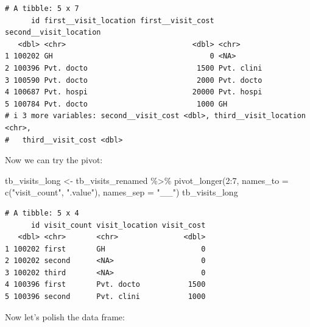 \documentclass[
  letterpaper,
  DIV=11,
  numbers=noendperiod]{scrreprt}
\newenvironment{Shaded}{\begin{snugshade}}{\end{snugshade}}
\newcommand{\AttributeTok}[1]{\textcolor[rgb]{0.40,0.45,0.13}{#1}}
\newcommand{\DecValTok}[1]{\textcolor[rgb]{0.68,0.00,0.00}{#1}}
\newcommand{\FunctionTok}[1]{\textcolor[rgb]{0.28,0.35,0.67}{#1}}
\newcommand{\NormalTok}[1]{\textcolor[rgb]{0.00,0.23,0.31}{#1}}
\newcommand{\OtherTok}[1]{\textcolor[rgb]{0.00,0.23,0.31}{#1}}
\newcommand{\SpecialCharTok}[1]{\textcolor[rgb]{0.37,0.37,0.37}{#1}}
\newcommand{\StringTok}[1]{\textcolor[rgb]{0.13,0.47,0.30}{#1}}
\begin{document}
\begin{verbatim}
# A tibble: 5 x 7
      id first__visit_location first__visit_cost second__visit_location
   <dbl> <chr>                             <dbl> <chr>                 
1 100202 GH                                    0 <NA>                  
2 100396 Pvt. docto                         1500 Pvt. clini            
3 100590 Pvt. docto                         2000 Pvt. docto            
4 100687 Pvt. hospi                        20000 Pvt. hospi            
5 100784 Pvt. docto                         1000 GH                    
# i 3 more variables: second__visit_cost <dbl>, third__visit_location <chr>,
#   third__visit_cost <dbl>
\end{verbatim}

Now we can try the pivot:

\begin{Shaded}
\begin{Highlighting}[]
\NormalTok{tb\_visits\_long }\OtherTok{\textless{}{-}}
\NormalTok{  tb\_visits\_renamed }\SpecialCharTok{\%\textgreater{}\%} 
  \FunctionTok{pivot\_longer}\NormalTok{(}\DecValTok{2}\SpecialCharTok{:}\DecValTok{7}\NormalTok{, }
               \AttributeTok{names\_to =} \FunctionTok{c}\NormalTok{(}\StringTok{"visit\_count"}\NormalTok{, }\StringTok{".value"}\NormalTok{), }
               \AttributeTok{names\_sep =} \StringTok{"\_\_"}\NormalTok{)}
\NormalTok{tb\_visits\_long}
\end{Highlighting}
\end{Shaded}

\begin{verbatim}
# A tibble: 5 x 4
      id visit_count visit_location visit_cost
   <dbl> <chr>       <chr>               <dbl>
1 100202 first       GH                      0
2 100202 second      <NA>                    0
3 100202 third       <NA>                    0
4 100396 first       Pvt. docto           1500
5 100396 second      Pvt. clini           1000
\end{verbatim}

Now let's polish the data frame:
\end{document}
